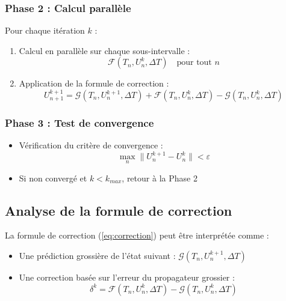 \subsubsection{Phase 2 : Calcul parallèle}
Pour chaque itération $k$ :
\begin{enumerate}
    \item Calcul en parallèle sur chaque sous-intervalle :
    \begin{equation}
        \mathcal{F}(T_n, U_n^k, \Delta T) \quad \text{pour tout } n
    \end{equation}
    
    \item Application de la formule de correction :
    \begin{equation}
        U_{n+1}^{k+1} = \mathcal{G}(T_n, U_n^{k+1}, \Delta T) + \mathcal{F}(T_n, U_n^k, \Delta T) - \mathcal{G}(T_n, U_n^k, \Delta T)
        \label{eq:correction}
    \end{equation}
\end{enumerate}

\subsubsection{Phase 3 : Test de convergence}
\begin{itemize}
    \item Vérification du critère de convergence :
    \begin{equation}
        \max_n \|U_n^{k+1} - U_n^k\| < \varepsilon
    \end{equation}
    \item Si non convergé et $k < k_{max}$, retour à la Phase 2
\end{itemize}

\subsection{Analyse de la formule de correction}
La formule de correction (\ref{eq:correction}) peut être interprétée comme :
\begin{itemize}
    \item Une prédiction grossière de l'état suivant : $\mathcal{G}(T_n, U_n^{k+1}, \Delta T)$
    \item Une correction basée sur l'erreur du propagateur grossier :
    \begin{equation}
        \delta^k = \mathcal{F}(T_n, U_n^k, \Delta T) - \mathcal{G}(T_n, U_n^k, \Delta T)
    \end{equation}
\end{itemize}

